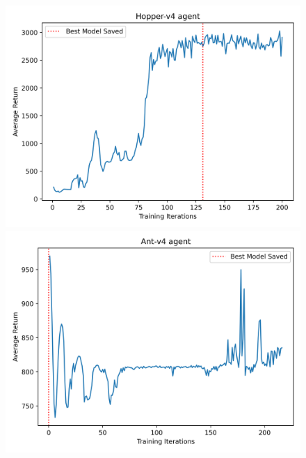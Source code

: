\begin{figure}[H]
\vspace{0.25ex}

\begin{minipage}{0.42\textwidth}
    \centering
    \includegraphics[width=\linewidth]{plots/Hopper-v4_avg_return.png}
\end{minipage}%
\hfill
\begin{minipage}{0.42\textwidth}
    \centering
    \includegraphics[width=\linewidth]{plots/Ant-v4_avg_return.png}
\end{minipage}

\vspace{0.25ex}


\end{figure}
